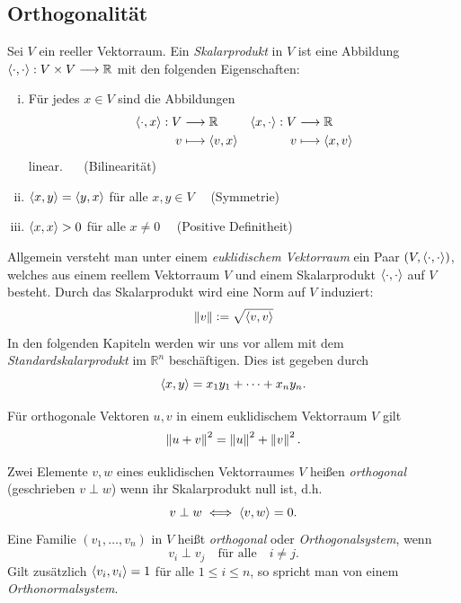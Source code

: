 \subsection{Orthogonalität}
\begin{defn}
Sei $V$ ein reeller Vektorraum. Ein \textit{Skalarprodukt} in $V$ ist eine Abbildung $\langle \cdot, \cdot \rangle: V \times V \longrightarrow \mathbb{R}$ mit den folgenden Eigenschaften:
\begin{enumerate}[(i)]
\item Für jedes $x \in V$ sind die Abbildungen
\begin{align*}
\langle \cdot, x \rangle: V & \longrightarrow \mathbb{R} & \langle x, \cdot \rangle: V & \longrightarrow \mathbb{R}\\
v & \longmapsto \langle v, x \rangle & v & \longmapsto \langle x, v \rangle
\end{align*}
linear. $\quad$ (Bilinearität)
\item $\langle x, y \rangle = \langle y, x \rangle$ für alle  $x,y \in V \quad$ (Symmetrie)
\item $\langle x, x \rangle > 0$ für alle $x \neq 0 \quad$ (Positive Definitheit)
\end{enumerate}
\end{defn}

Allgemein versteht man unter einem \textit{euklidischem Vektorraum} ein Paar $(V, \langle \cdot, \cdot \rangle)$, welches aus einem reellem Vektorraum $V$ und einem Skalarprodukt $\langle \cdot, \cdot \rangle$ auf $V$ besteht. Durch das Skalarprodukt wird eine Norm auf $V$ induziert:
$$\left\lVert v \right\rVert \vcentcolon= \sqrt{\langle v, v \rangle}$$
In den folgenden Kapiteln werden wir uns vor allem mit dem \textit{Standardskalarprodukt} im $\mathbb{R}^n$ beschäftigen. Dies ist gegeben durch 
$$\langle x, y \rangle = x_1y_1 + \cdots + x_ny_n.$$

\begin{thm}
\label{pythagoras}
Für orthogonale Vektoren $u,v$ in einem euklidischem Vektorraum $V$ gilt
$$\left\lVert u+v \right\rVert^2 = \left\lVert u \right\rVert^2 + \left\lVert v \right\rVert^2.$$
\end{thm}

\begin{defn}
Zwei Elemente $v, w$ eines euklidischen Vektorraumes $V$ heißen \textit{orthogonal} (geschrieben $v \perp w$) wenn ihr Skalarprodukt null ist, d.h.
$$v \perp w \iff \langle v, w \rangle = 0.$$
Eine Familie $(v_1, \ldots, v_n)$ in $V$ heißt \textit{orthogonal} oder \textit{Orthogonalsystem}, wenn
$$v_i \perp v_j \quad \text{für alle} \quad i \neq j.$$
Gilt zusätzlich $\langle v_i, v_i \rangle = 1$ für alle $1 \leq i \leq n$, so spricht man von einem \textit{Orthonormalsystem}.
\end{defn}

